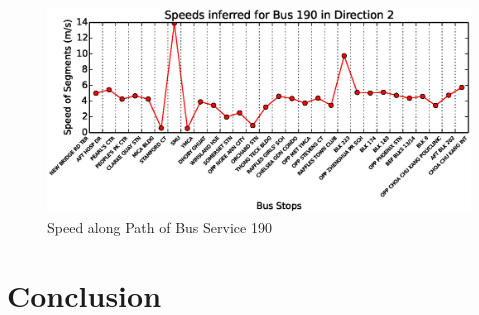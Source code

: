 \documentclass{sig-alternate}
\begin{document}
\begin{figure}[htb]
	\centering
	\includegraphics[width=6.5in]{190_2_speed}
	\caption{Speed along Path of Bus Service 190}
	\label{fig:190_2_speed}
\end{figure}

\section{Conclusion}



\end{document}
